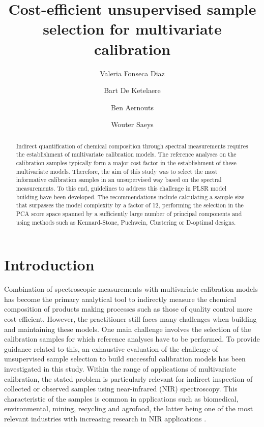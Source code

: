\documentclass[journal=ancham,manuscript=article]{achemso}
\author{Valeria Fonseca Diaz}
\author{Bart De Ketelaere}
\author{Ben Aernouts}
\author{Wouter Saeys}
\affiliation[KU Leuven]
{KU Leuven, Mechatronics, Biostatistics and Sensors (MeBioS), Kasteelpark
Arenberg 30, 3001 Leuven, Belgium}
\title[An \textsf{achemso} demo]
  {Cost-efficient unsupervised sample selection for multivariate calibration}
\begin{document}
\begin{abstract}
Indirect quantification of chemical composition through spectral measurements requires the establishment of multivariate calibration models. The reference analyses on the calibration samples typically form a major cost factor in the establishment of these multivariate models. Therefore, the aim of this study was to select the most informative calibration samples in an unsupervised way based on the spectral measurements. To this end, guidelines to address this challenge in PLSR model building have been developed. The recommendations include calculating a sample size that surpasses the model complexity by a factor of 12, performing the selection in the PCA score space spanned by a sufficiently large number of principal components and using methods such as Kennard-Stone, Puchwein, Clustering or D-optimal designs.

\end{abstract}%


\section{Introduction}\label{introduction}

Combination of spectroscopic measurements with multivariate calibration models has become the primary analytical tool to indirectly measure the chemical composition of products making processes such as those of quality control more cost-efficient. However, the practitioner still faces many challenges when building and maintaining these models. One main challenge involves the selection of the calibration samples for which reference analyses have to be performed. To provide guidance related to this, an exhaustive evaluation of the challenge of unsupervised sample selection to build successful calibration models has been investigated in this study. Within the range of applications of multivariate calibration, the stated problem is particularly relevant for indirect inspection of collected or observed samples using near-infrared (NIR) spectroscopy. This characteristic of the samples is common in applications such as biomedical, environmental, mining, recycling and agrofood, the latter being one of the most relevant industries with increasing research in NIR applications \cite{Au2020,Diaz-Olivares2020, Saeys2005, Bobelyn2010}.
\end{document}

